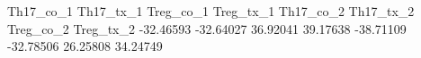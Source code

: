 \begin{Schunk}
\begin{Soutput}
Th17_co_1 Th17_tx_1 Treg_co_1 Treg_tx_1 Th17_co_2 Th17_tx_2 Treg_co_2 Treg_tx_2 
-32.46593 -32.64027  36.92041  39.17638 -38.71109 -32.78506  26.25808  34.24749 
\end{Soutput}
\end{Schunk}

